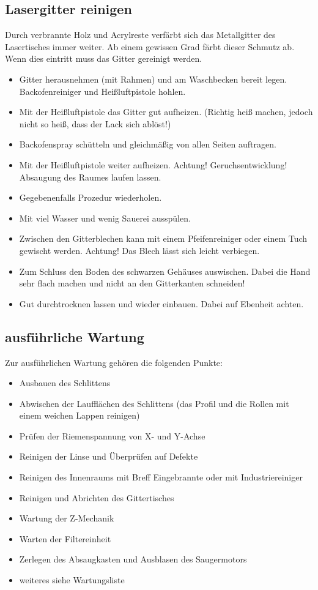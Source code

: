 \documentclass{\basedir/fablab-document}
\begin{document}
	\subsection{Lasergitter reinigen}
	Durch verbrannte Holz und Acrylreste verfärbt sich das Metallgitter des Lasertisches immer weiter. Ab einem gewissen Grad färbt dieser Schmutz ab. Wenn dies eintritt muss das Gitter gereinigt werden.
	\begin{itemize}
		\item Gitter herausnehmen (mit Rahmen) und am Waschbecken bereit legen. Backofenreiniger und Heißluftpistole hohlen.
		\item Mit der Heißluftpistole das Gitter gut aufheizen. (Richtig heiß machen, jedoch nicht so heiß, dass der Lack sich ablöst!)
		\item Backofenspray schütteln und gleichmäßig von allen Seiten auftragen.
		\item Mit der Heißluftpistole weiter aufheizen. Achtung! Geruchsentwicklung! Absaugung des Raumes laufen lassen.
		\item Gegebenenfalls Prozedur wiederholen.
		\item Mit viel Wasser und wenig Sauerei ausspülen.
		\item Zwischen den Gitterblechen kann mit einem Pfeifenreiniger oder einem Tuch gewischt werden. Achtung! Das Blech lässt sich leicht verbiegen.
		\item Zum Schluss den Boden des schwarzen Gehäuses auswischen. Dabei die Hand sehr flach machen und nicht an den Gitterkanten schneiden!
		\item Gut durchtrocknen lassen und wieder einbauen. Dabei auf Ebenheit achten.
	\end{itemize}
	\subsection{ausführliche Wartung}
	Zur ausführlichen Wartung gehören die folgenden Punkte:
	\begin{itemize}
		\item Ausbauen des Schlittens
		\item Abwischen der Laufflächen des Schlittens (das Profil und die Rollen mit einem weichen Lappen reinigen)
		\item Prüfen der Riemenspannung von X- und Y-Achse
		\item Reinigen der Linse und Überprüfen auf Defekte
		\item Reinigen des Innenraums mit Breff Eingebrannte oder mit Industriereiniger
		\item Reinigen und Abrichten des Gittertisches
		\item Wartung der Z-Mechanik
		\item Warten der Filtereinheit
		\item Zerlegen des Absaugkasten und Ausblasen des Saugermotors
		\item weiteres siehe Wartungsliste
	\end{itemize}
	
\end{document}
